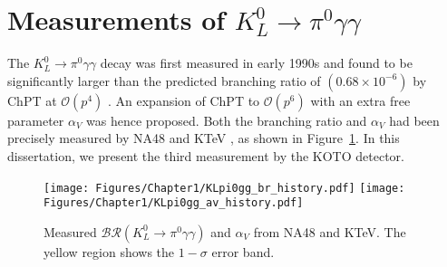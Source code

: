 
\section{Measurements of $K_L^0\to\pi^0\gamma\gamma$}

The $K_L^0\to\pi^0\gamma\gamma$ decay was first measured in early 1990s \parencite{KLpi0gg_1st, KLpi0gg_2nd, KLpi0gg_3rd} and found to be significantly larger than the predicted branching ratio of $(0.68 \times 10^{-6})$ by ChPT at $\mathcal{O}(p^4)$ \parencite{KLpi0gg_ChPT_p4}. An expansion of ChPT to $\mathcal{O}(p^6)$ with an extra free parameter $\alpha_V$ was hence proposed. Both the branching ratio and $\alpha_V$ had been precisely measured by NA48 \parencite{KLpi0gg_NA48} and KTeV \parencite{KLpi0gg_KTeV}, as shown in Figure~\ref{fig:KLpi0gg_history}. In this dissertation, we present the third measurement by the KOTO detector.

\begin{figure}[h]
\begin{center}
\captionsetup{width=.99\linewidth}
\texttt{[image: Figures/Chapter1/KLpi0gg\_br\_history.pdf]}
\texttt{[image: Figures/Chapter1/KLpi0gg\_av\_history.pdf]}
\caption[Measured $\mathcal{BR}(K_L^0\to\pi^0\gamma\gamma)$ and $\alpha_V$ from NA48 and KTeV. ]{Measured $\mathcal{BR}(K_L^0\to\pi^0\gamma\gamma)$ and $\alpha_V$ from NA48 and KTeV. The yellow region shows the $1-\sigma$ error band.}
\label{fig:KLpi0gg_history}
\end{center}
\end{figure}